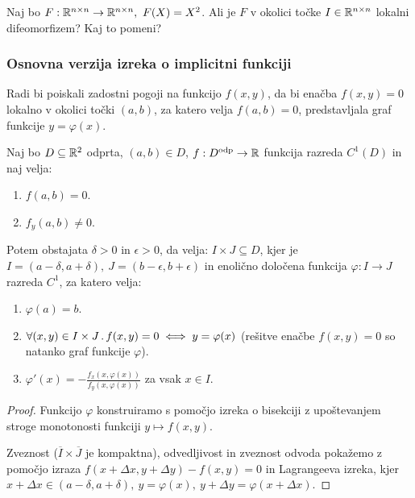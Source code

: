 \begin{zgled}
    Naj bo $F: \mathbb{R}^{n \times n} \to \mathbb{R}^{n \times n}, \ F(X) = X^2$. Ali je $F$ v okolici točke $I \in \mathbb{R}^{n \times n}$ lokalni difeomorfizem? Kaj to pomeni?
\end{zgled}

\subsubsection{Osnovna verzija izreka o implicitni funkciji}
Radi bi poiskali zadostni pogoji na funkcijo $f(x, y)$, da bi enačba $f(x, y) = 0$ lokalno v okolici točki $(a,b)$, za katero velja $f(a,b) = 0$, predstavljala graf funkcije $y = \varphi(x)$.

\begin{izrek}
    Naj bo $D \subseteq \mathbb{R}^2$ odprta,  $(a, b) \in D$,  $f: D^\text{odp} \to \mathbb{R}$ funkcija razreda $ C^1(D)$ in naj velja:
    \begin{enumerate}
        \item $f(a,b) = 0$.
        \item $f_y(a,b) \neq 0$.
    \end{enumerate}
    Potem obstajata $\delta > 0$ in $\epsilon > 0$, da velja: $I \times J \subseteq D$, kjer je $I = (a - \delta, a + \delta), \ J = (b-\epsilon, b+\epsilon)$ in enolično določena funkcija $\varphi: I \to J$ razreda $C^1$, za katero velja:
    \begin{enumerate}
        \item $\varphi(a) = b$.
        \item $\forall (x,y) \in I \times J \,.\, f(x, y) = 0 \iff y = \varphi (x)$ (rešitve enačbe $f(x,y) = 0$ so natanko graf funkcije $\varphi$).
        \item $\varphi'(x) = -\frac{f_x(x, \varphi(x))}{f_y(x, \varphi(x))}$ za vsak $x \in I$.
    \end{enumerate}
\end{izrek}

\begin{proof}
    Funkcijo $\varphi$ konstruiramo s pomočjo izreka o bisekciji z upoštevanjem stroge monotonosti funkciji $y \mapsto f(x, y)$.

    Zveznost ($\overline{I} \times \overline{J}$ je kompaktna), odvedljivost in zveznost odvoda pokažemo z pomočjo izraza $f(x + \Delta x, y + \Delta y) - f(x,y) = 0$ in Lagrangeeva izreka, kjer $x + \Delta x \in (a - \delta, a + \delta), \ y= \varphi (x), \ y + \Delta y = \varphi(x + \Delta x)$.
\end{proof}

